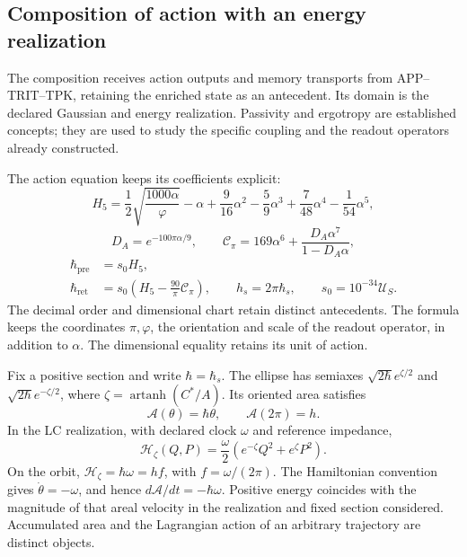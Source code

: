 \subsection{Composition of action with an energy realization}
\label{md:aux:accion}

The composition receives action outputs and memory transports from
APP--TRIT--TPK, retaining the enriched state as an antecedent.
Its domain is the declared Gaussian and energy realization.
Passivity and ergotropy are established concepts; they are used to
study the specific coupling and the readout operators already
constructed.

The action equation keeps its coefficients explicit:
\begin{equation}
 H_5=\frac12\sqrt{\frac{1000\alpha}{\varphi}}-\alpha
 +\frac9{16}\alpha^2-\frac59\alpha^3
 +\frac7{48}\alpha^4-\frac1{54}\alpha^5,
 \label{md:aux:h5}
\end{equation}
\begin{equation}
 D_A=e^{-100\pi\alpha/9},\qquad
 \mathcal C_\pi=169\alpha^6+\frac{D_A\alpha^7}{1-D_A\alpha},
 \label{md:aux:correccion-accion}
\end{equation}
\begin{equation}
 \begin{aligned}
 \hbar_{\mathrm{pre}}&=s_0H_5,\\
 \hbar_{\mathrm{ret}}&=s_0\left(H_5-\frac{90}{\pi}\mathcal C_\pi\right),
 \qquad h_s=2\pi\hbar_s,\qquad s_0=10^{-34}\mathcal U_S.
 \end{aligned}
 \label{md:aux:secciones-accion}
\end{equation}
The decimal order and dimensional chart retain distinct antecedents.
The formula keeps the coordinates $\pi,\varphi$, the orientation
and scale of the readout operator, in addition to $\alpha$.
The dimensional equality retains its unit of action.

Fix a positive section and write $\hbar=\hbar_s$.
The ellipse has semiaxes $\sqrt{2\hbar}e^{\zeta/2}$ and
$\sqrt{2\hbar}e^{-\zeta/2}$, where
$\zeta=\operatorname{artanh}(C^*/A)$. Its oriented area satisfies
\begin{equation}
 \mathcal A(\theta)=\hbar\theta,\qquad
 \mathcal A(2\pi)=h.
 \label{md:aux:area-fase}
\end{equation}
In the LC realization, with declared clock $\omega$ and reference
impedance,
\begin{equation}
 \mathcal H_\zeta(Q,P)
 =\frac\omega2\left(e^{-\zeta}Q^2+e^\zeta P^2\right).
 \label{md:aux:hamiltoniano-lc}
\end{equation}
On the orbit, $\mathcal H_\zeta=\hbar\omega=hf$, with
$f=\omega/(2\pi)$. The Hamiltonian convention gives
$\dot\theta=-\omega$, and hence
$d\mathcal A/dt=-\hbar\omega$. Positive energy coincides with the
magnitude of that areal velocity in the realization and fixed section
considered. Accumulated area and the Lagrangian action of an arbitrary
trajectory are distinct objects.

